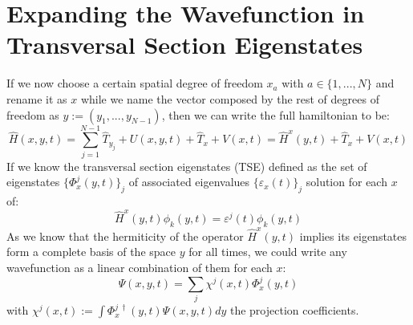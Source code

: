 \documentclass[11pt, a4paper]{article} %
\begin{document}
\newpage
\section{Expanding the Wavefunction in Transversal Section Eigenstates}
If we now choose a certain spatial degree of freedom $x_a$ with $a\in\{1,...,N\}$ and rename it as $x$ while we name the vector composed by the rest of degrees of freedom as $y:=(y_1,...,y_{N-1})$, then we can write the full hamiltonian to be:
\begin{equation}
\hat{H}(x, y, t)= \sum_{j=1}^{N-1}\hat{T}_{y_j}+U(x, y, t)+\hat{T}_x+V(x,t) = \hat{H}^x(y,t)+\hat{T}_x+V(x,t)
\end{equation}
If we know the transversal section eigenstates (TSE) defined as the set of eigenstates $\{ \Phi^j_x(y,t)\}_j$ of associated eigenvalues $\{\varepsilon_x(t) \}_j$ solution for each $x$ of:
\begin{equation}
\hat{H}^x(y,t)\phi_k(y,t)=\varepsilon^j(t)\phi_k(y,t)
\end{equation}
As we know that the hermiticity of the operator $\hat{H}^x(y,t)$ implies its eigenstates form a complete basis of the space $y$ for all times, we could write any wavefunction as a linear combination of them for each $x$:
\begin{equation}
\Psi(x,y,t)=\sum_j \chi^j(x,t) \Phi^j_x(y,t)
\end{equation}
with $\chi^j(x,t):= \int \Phi^{j\ \dagger}_x(y,t) \Psi(x,y,t)dy$ the projection coefficients.
\end{document}
